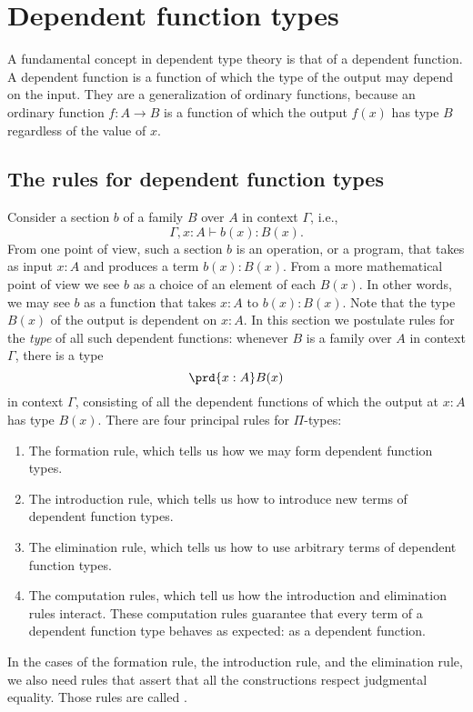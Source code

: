 \section{Dependent function types}
\label{ch:pi}

A fundamental concept in dependent type theory is that of a dependent function. A dependent function is a function of which the type of the output may depend on the input. They are a generalization of ordinary functions, because an ordinary function $f:A\to B$ is a function of which the output $f(x)$ has type $B$ regardless of the value of $x$.

\subsection{The rules for dependent function types}
Consider a section $b$ of a family $B$ over $A$ in context $\Gamma$, i.e.,
\begin{equation*}
  \Gamma,x:A\vdash b(x):B(x).
\end{equation*}
From one point of view, such a section $b$ is an operation, or a program, that takes as input $x:A$ and produces a term $b(x):B(x)$. From a more mathematical point of view we see $b$ as a choice of an element of each $B(x)$. In other words, we may see $b$ as a function that takes $x:A$ to $b(x):B(x)$. Note that the type $B(x)$ of the output is dependent on $x:A$. In this section we postulate rules for the \emph{type} of all such dependent functions: whenever $B$ is a family over $A$ in context $\Gamma$, there is a type
\begin{equation*}
  \prd{x:A}B(x)
\end{equation*}
in context $\Gamma$, consisting of all the dependent functions of which the output at $x:A$ has type $B(x)$. There are four principal rules for $\Pi$-types:
\begin{enumerate}
\item The formation rule, which tells us how we may form dependent function types.
\item The introduction rule, which tells us how to introduce new terms of dependent function types.
\item The elimination rule, which tells us how to use arbitrary terms of dependent function types.
\item The computation rules, which tell us how the introduction and elimination rules interact. These computation rules guarantee that every term of a dependent function type behaves as expected: as a dependent function.
\end{enumerate}
In the cases of the formation rule, the introduction rule, and the elimination rule, we also need rules that assert that all the constructions respect judgmental equality. Those rules are called .

